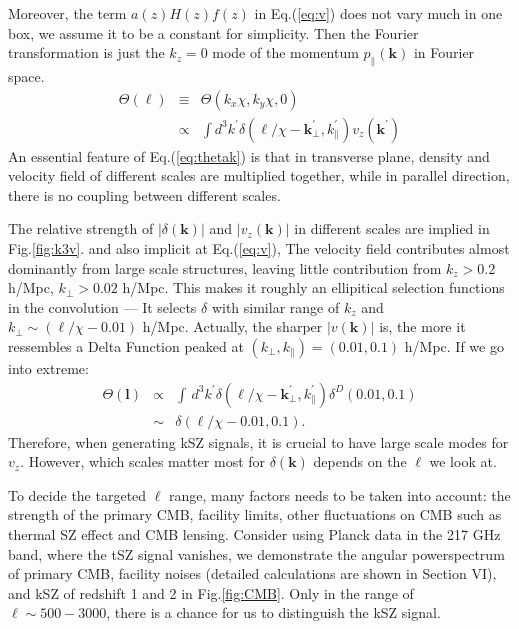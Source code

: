 Moreover, the term $a(z)H(z)f(z)$ in Eq.(\ref{eq:v}) does not vary much in one box, we assume it to be a constant for simplicity. 
Then the Fourier transformation is just the $k_z=0$ mode of the momentum 
$p_\parallel(\bm{k})$ in Fourier space. 
\begin{eqnarray}
    \label{eq:thetak}
    \Theta(\bm{\ell})&\equiv&\Theta({k}_x\chi,{k}_y\chi,0)\\
    &\propto&\int 
    d^3k^\prime\delta(\bm{\ell}/\chi-\bm{k}_\perp^\prime,k_\parallel^\prime) v_z(\bm{k^\prime})\nonumber
    \end{eqnarray}
An essential feature of Eq.(\ref{eq:thetak}) is that
in transverse plane, density and velocity field of different scales are multiplied together, 
 while in parallel direction, 
 there is no coupling between different scales.  

The relative strength of $|\delta(\bm{k})|$ and $|v_z(\bm{k})|$ in different scales 
are implied in Fig.\ref{fig:k3v}. 
and also implicit at Eq.(\ref{eq:v}), 
The velocity field contributes almost dominantly from large scale structures, 
leaving little contribution from $k_z>0.2$ h/Mpc, $k_\perp> 0.02$ h/Mpc. 
This makes it roughly an ellipitical selection functions in the convolution
---
It selects $\delta$ with similar range of $k_z$ and $k_\perp\sim(\ell/\chi-0.01)$ h/Mpc.  
Actually, the sharper $|v(\bm{k})|$ is, 
the more it ressembles a Delta Function peaked at 
$(k_\perp,k_\parallel)=(0.01,0.1)$ h/Mpc. 
If we go into extreme:  
\begin{eqnarray}
    \Theta(\bm{l}) &\propto& \int\, 
    d^3k^\prime\delta(\bm{\ell}/\chi-\bm{k}_\perp^\prime,k_\parallel^\prime) 
    \delta^D(0.01,0.1) \\
    &\sim& \delta(\ell/\chi-0.01,0.1).
\end{eqnarray}
Therefore, when generating kSZ signals, 
it is crucial to have large scale modes for $v_z$. 
However, which scales matter most for $\delta(\bm{k})$ 
depends on the $\ell$ we look at.  

To decide the targeted $\ell$ range, 
many factors needs to be taken into account:  
the strength of the primary CMB, facility limits, 
other fluctuations on CMB such as thermal SZ effect and CMB lensing.
Consider using Planck \cite{Planck2015} data 
in the 217 GHz band, where the tSZ signal vanishes, 
we demonstrate the angular powerspectrum of primary CMB, 
facility noises (detailed calculations are shown in Section VI), 
and kSZ of redshift 1 and 2 
in Fig.\ref{fig:CMB}. 
Only in the range of $\ell \sim 500-3000$, 
there is a chance for us to distinguish the kSZ signal.  

